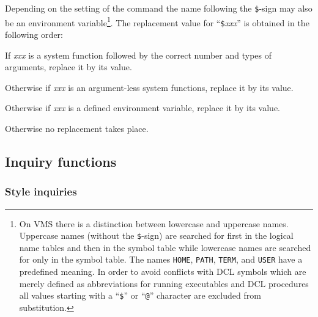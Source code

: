 Depending on the setting of the  command
the name following the \verb!$!-sign may also be an environment
variable\footnote{%
  On VMS there is a distinction between lowercase and uppercase names.
  Uppercase names (without the \texttt{\$}-sign) are searched for
  first in the logical name tables and then in the symbol table while
  lowercase names are searched for only in the symbol table.  The
  names \texttt{HOME}, \texttt{PATH}, \texttt{TERM}, and \texttt{USER}
  have a predefined meaning.  In order to avoid conflicts with DCL
  symbols which are merely defined as abbreviations for running
  executables and DCL procedures all values starting with a
  ``\texttt{\$}'' or ``\texttt{@}'' character are excluded from
  substitution.}.  
The replacement value for ``\verb!$!\textsl{xxx}'' is obtained 
in the following order:
\begin{OL}
\item
If \textsl{xxx} is a system function followed by the correct
number and types of arguments, replace it by its value.
\item
Otherwise if \textsl{xxx} is an argument-less system functions, replace it by
its value.
\item
Otherwise if \textsl{xxx} is a defined environment variable, replace it
by its value.
\item
Otherwise no replacement takes place.
\end{OL}


\subsection{Inquiry functions}


\subsubsection{Style inquiries}

